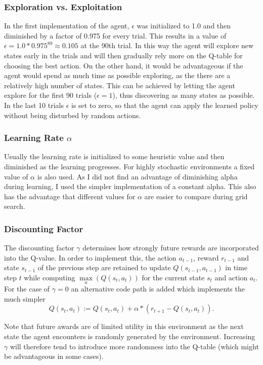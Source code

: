 \documentclass[11pt]{article}
\begin{document}
\subsubsection{Exploration vs. Exploitation}
In the first implementation of the agent, $\epsilon$ was initialized to 1.0 and then diminished by a factor of 0.975 for every trial. This results in a value of $\epsilon = 1.0 * 0.975^{89} \approx 0.105$ at the 90th trial. In this way the agent will explore new states early 
in the trials and will then gradually rely more on the Q-table for choosing the best action. On the other hand, it would be advantageous if the agent would spend as much time as possible exploring, as the there are a relatively high number of states. This can be achieved by letting the agent explore for the first 90 trials ($\epsilon = 1$), thus discovering as many states as possible. In the last 10 trials $\epsilon$ is set to zero, so that the agent can apply the learned policy without being disturbed by random actions.

\subsubsection{Learning Rate $\alpha$}
Usually the learning rate is initialized to some heuristic value and then diminished as the learning progresses. For highly stochastic environments a fixed value of $\alpha$ is also used. As I did not find an advantage of diminishing alpha during learning, I used the simpler implementation of a constant alpha. This also has the advantage that different values for $\alpha$ are easier to compare during grid search.

\subsubsection{Discounting Factor}
The discounting factor $\gamma$ determines how strongly future rewards are incorporated into the Q-value. In order to implement this, the action $a_{t-1}$, reward $r_{t-1}$ and state $s_{t-1}$ of the previous step are retained to update $Q(s_{t-1},a_{t-1})$ in time step $t$ while computing $\max\limits_a(Q(s_{t},a_{t}))$ for the current state $s_t$ and action $a_t$. For the case of $\gamma = 0$ an alternative code path is added which implements the much simpler
\begin{equation}
    Q(s_t,a_t) :=  Q(s_t,a_t) + \alpha * (r_{t+1} - Q(s_t,a_t)).
\end{equation}

Note that future awards are of limited utility in this environment as the next state the agent encounters is randomly generated by the environment. Increasing $\gamma$ will therefore tend to introduce more randomness into the Q-table (which might be advantageous in some cases).
\end{document}

